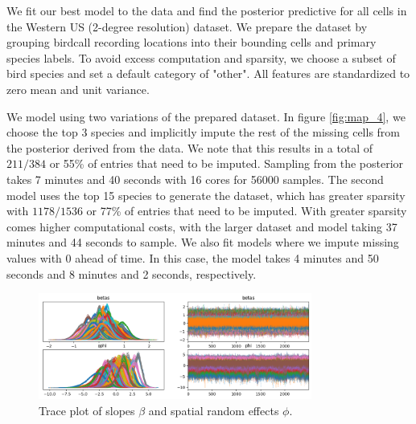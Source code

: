 \documentclass[notitlepage]{article}
\begin{document}
We fit our best model to the data and find the posterior predictive for all cells in the Western US (2-degree resolution) dataset.
We prepare the dataset by grouping birdcall recording locations into their bounding cells and primary species labels.
To avoid excess computation and sparsity, we choose a subset of bird species and set a default category of "other".
All features are standardized to zero mean and unit variance.

We model using two variations of the prepared dataset.
In figure \ref{fig:map_4}, we choose the top 3 species and implicitly impute the rest of the missing cells from the posterior derived from the data.
We note that this results in a total of $211/384$ or 55\% of entries that need to be imputed.
Sampling from the posterior takes 7 minutes and 40 seconds with 16 cores for 56000 samples.
The second model uses the top 15 species to generate the dataset, which has greater sparsity with $1178/1536$ or 77\% of entries that need to be imputed.
With greater sparsity comes higher computational costs, with the larger dataset and model taking 37 minutes and 44 seconds to sample.
We also fit models where we impute missing values with 0 ahead of time.
In this case, the model takes 4 minutes and 50 seconds and 8 minutes and 2 seconds, respectively.

\begin{figure}[H]
\centering
\includegraphics[width=0.8\textwidth]{report/figures/trace_plot_phi.png}
\caption{Trace plot of slopes $\beta$ and spatial random effects $\phi$.}
\label{fig:trace_plot}
\end{figure}
\end{document}
